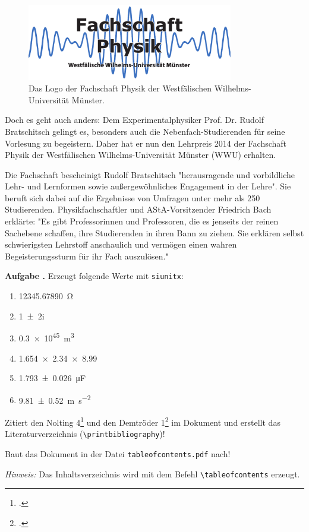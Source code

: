 \documentclass[a4paper, 12pt, headsepline, pagesize=auto]{scrartcl}
\newcounter{aufgabe}
\newenvironment{aufgabe}[1][]{\stepcounter{aufgabe}
\noindent\textbf{Aufgabe \arabic{aufgabe}.} #1\par
\begin{enumerate}[label=\alph*)]}{\end{enumerate}\bigskip}
\newenvironment{aufgabe*}[1][]{\stepcounter{aufgabe}
\noindent\textbf{Aufgabe \arabic{aufgabe}.} #1}{\bigskip}
\begin{document}
\begin{figure}
	\centering
	\includegraphics[width=9cm]{res/logo.pdf}
	\caption{Das Logo der Fachschaft Physik der Westfälischen Wilhelms-Universität Münster.}
\end{figure}
Doch es geht auch anders: Dem Experimentalphysiker Prof. Dr. Rudolf Bratschitsch gelingt es, besonders auch die Nebenfach-Studierenden für seine Vorlesung zu begeistern. Daher hat er nun den Lehrpreis 2014 der Fachschaft Physik der Westfälischen Wilhelms-Universität Münster (WWU) erhalten.

Die Fachschaft bescheinigt Rudolf Bratschitsch "herausragende und vorbildliche Lehr- und Lernformen sowie außergewöhnliches Engagement in der Lehre". Sie beruft sich dabei auf die Ergebnisse von Umfragen unter mehr als 250 Studierenden. Physikfachschaftler und AStA-Vorsitzender Friedrich Bach erklärte: "Es gibt Professorinnen und Professoren, die es jenseits der reinen Sachebene schaffen, ihre Studierenden in ihren Bann zu ziehen. Sie erklären selbst schwierigsten Lehrstoff anschaulich und vermögen einen wahren Begeisterungssturm für ihr Fach auszulösen."

\begin{aufgabe}[Erzeugt folgende Werte mit \texttt{siunitx}:]
	\item \SI{12345,67890}{\ohm}
	\item \num{1 +- 2i}
	\item \SI{.3e45}{\m\cubed}
	\item \num{1.654 x 2.34 x 8,99}
	\item \SI{1,793 +- 0,026}{\micro\F}
	\item \SI{9,81+-0,52}{\m\per\s\squared}
\end{aufgabe}

\begin{aufgabe*}
	Zitiert den Nolting 4\footcite{nolting4} und den Demtröder 1\footcite{demtröder1} im Dokument und erstellt das Literaturverzeichnis (\lstinline!\printbibliography!)!
\end{aufgabe*}

\begin{aufgabe*}
Baut das Dokument in der Datei \texttt{tableofcontents.pdf} nach!

\emph{Hinweis:} Das Inhaltsverzeichnis wird mit dem Befehl \lstinline!\tableofcontents! erzeugt.
\end{aufgabe*}
\end{document}
